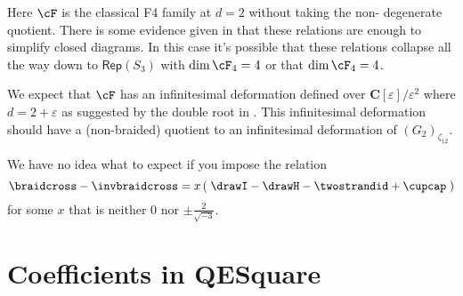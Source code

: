 \documentclass[12pt]{amsart}
\begin{document}
Here $\cF$ is the classical F4 family at $d=2$ without taking the non-
degenerate quotient.  There is some evidence given in \cite{???} that these
relations are enough to simplify closed diagrams.  In this case it's possible
that these relations collapse all the way down to $\mathsf{Rep}(S_3)$ with
$\dim \cF_4 = 4$ or that $\dim \cF_4 = 4$.

\begin{remark}
We expect that $\cF$ has an infinitesimal deformation defined over
$\mathbf{C}[\varepsilon]/\varepsilon^2$ where $d = 2+\varepsilon$ as suggested
by the double root in \cite{???}.  This infinitesimal deformation should have
a (non-braided) quotient to an infinitesimal deformation of
$(G_2)_{\zeta_{12}}$.
\end{remark}

We have no idea what to expect if you impose the relation
$$\braidcross - \invbraidcross = x \left(\;\drawI - \drawH - \twostrandid + \cupcap \; \right)$$ 
for some $x$ that is neither $0$ nor $\pm \frac{2}{\sqrt{-3}}$.




\appendix
\section{Coefficients in QESquare}
\label{app:coefficients}

\nn{}

\renewcommand*{\bibfont}{\small}
\setlength{\bibitemsep}{0pt}
\raggedright
\printbibliography
\end{document}
